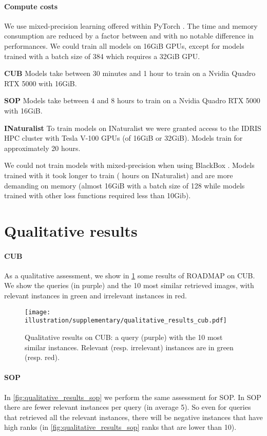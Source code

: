 \paragraph*{Compute costs}

We use mixed-precision learning offered within PyTorch \cite{pytorch}. The time and memory consumption are reduced by a factor between  and  with no notable difference in performances. We could train all models on 16GiB GPUs, except for models trained with a batch size of 384 which requires a 32GiB GPU.

\textbf{CUB} Models take between 30 minutes and 1 hour to train on a Nvidia Quadro RTX 5000 with 16GiB.

\textbf{SOP} Models take between 4 and 8 hours to train on a Nvidia Quadro RTX 5000 with 16GiB.

\textbf{INaturalist} To train models on INaturalist we were granted access to the IDRIS HPC cluster with Tesla V-100 GPUs (of 16GiB or 32GiB). Models train for approximately 20 hours.

We could not train models with mixed-precision when using BlackBox \cite{blackboxap}. Models trained with it took longer to train ( hours on INaturalist) and are more demanding on memory (almost 16GiB with a batch size of 128 while models trained with other loss functions required less than 10Gib).


\section{Qualitative results}

\paragraph{CUB} As a qualitative assessment, we show in \cref{fig:qualitative_results_cub} some results of ROADMAP on CUB. We show the queries (in purple) and the 10 most similar retrieved images, with relevant instances in green and irrelevant instances in red.

\begin{figure}[ht]
    \centering
    \texttt{[image: illustration/supplementary/qualitative\_results\_cub.pdf]}
    \caption{Qualitative results on CUB: a query (purple) with the 10 most similar instances. Relevant (resp. irrelevant) instances are in green (resp. red).}
    \label{fig:qualitative_results_cub}
\end{figure}


\paragraph{SOP} In \cref{fig:qualitative_results_sop} we perform the same assessment for SOP.
In SOP there are fewer relevant instances per query (in average 5). So even for queries that retrieved all the relevant instances, there will be negative instances that have high ranks (in \cref{fig:qualitative_results_sop} ranks that are lower than 10).

